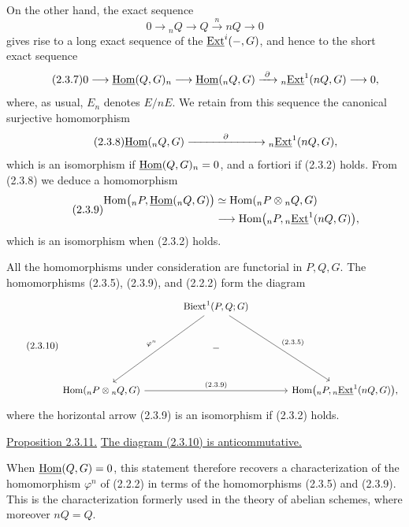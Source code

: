 On the other hand, the exact sequence
\begin{equation}\tag{2.3.6}
 0\longrightarrow{}_nQ\longrightarrow Q
 \xrightarrow{\ n\ }nQ\longrightarrow0
\end{equation}
gives rise to a long exact sequence of the $\uExt^i(-,G)$, and hence
to the short exact sequence
\begin{equation}\tag{2.3.7}
 0\longrightarrow\uHom(Q,G)_n
 \longrightarrow\uHom({}_nQ,G)
 \xrightarrow{\ \partial\ }
 {}_n\uExt^1(nQ,G)
 \longrightarrow0,
\end{equation}
where, as usual, $E_n$ denotes $E/nE$.  We retain from this sequence
the canonical surjective homomorphism
\begin{equation}\tag{2.3.8}
 \uHom({}_nQ,G)
 \xrightarrow{\hspace{3em}\partial\hspace{3em}}
 {}_n\uExt^1(nQ,G),
\end{equation}
which is an isomorphism if $\uHom(Q,G)_n=0$, and a fortiori if (2.3.2)
holds.  From (2.3.8) we deduce a homomorphism
\begin{equation}\tag{2.3.9}
\begin{split}
 \operatorname{Hom}\bigl({}_nP,\uHom({}_nQ,G)\bigr)
 &\simeq
 \operatorname{Hom}({}_nP\otimes{}_nQ,G)\\
 &\longrightarrow
 \operatorname{Hom}\bigl({}_nP,{}_n\uExt^1(nQ,G)\bigr),
\end{split}
\end{equation}
which is an isomorphism when (2.3.2) holds.

All the homomorphisms under consideration are functorial in $P,Q,G$.
The homomorphisms (2.3.5), (2.3.9), and (2.2.2) form the diagram
\begin{equation}\tag{2.3.10}
\begin{tikzcd}[column sep=large,row sep=large]
 &\mathrm{Biext}^1(P,Q;G)
   \arrow[ddl,"\varphi^n"']
   \arrow[ddr,"(2.3.5)"]&\\
 &-&\\
 \operatorname{Hom}({}_nP\otimes{}_nQ,G)
   \arrow[rr,"(2.3.9)"]&&
 \operatorname{Hom}\bigl({}_nP,{}_n\uExt^1(nQ,G)\bigr),
\end{tikzcd}
\end{equation}
where the horizontal arrow (2.3.9) is an isomorphism if (2.3.2)
holds.

\medskip
\noindent\underline{Proposition 2.3.11.}
\underline{The diagram (2.3.10) is anticommutative.}

When $\uHom(Q,G)=0$, this statement therefore recovers a
characterization of the homomorphism $\varphi^n$ of (2.2.2) in terms
of the homomorphisms (2.3.5) and (2.3.9).  This is the
characterization formerly used in the theory of abelian schemes,
where moreover $nQ=Q$.
